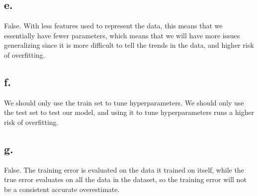 \documentclass{article}
\newcommand{\1}{\mathbf{1}}
\begin{document}
{\subsection*{e.}

False. With less features used to represent the data, this means that we essentially have fewer parameters, which means that we will have more issues generalizing since it is more difficult to tell the trends in the data, and higher risk of overfitting.

\subsection*{f.}

We should only use the train set to tune hyperparameters. We should only use the test set to test our model, and using it to tune hyperparameters runs a higher risk of overfitting.

\subsection*{g.}

False. The training error is evaluated on the data it trained on itself, while the true error evaluates on all the data in the dataset, so the training error will not be a consistent accurate overestimate.

}
\end{document}
